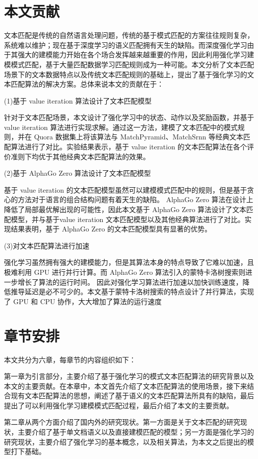 \section{本文贡献}
文本匹配是传统的自然语言处理问题，传统的基于模式匹配的方案往往规则复杂，系统难以维护；现在基于深度学习的语义匹配拥有天生的缺陷。而深度强化学习由于其强大的建模能力开始在各个场合发挥越来越重要的作用，因此利用强化学习建模模式匹配，基于大量匹配数据学习匹配规则成为一种可能。本文分析了文本匹配场景下的文本数据特点以及传统文本匹配规则的基础上，提出了基于强化学习的文本匹配算法的解决方案。总体来说本文的贡献在于：

(1)基于 value iteration 算法设计了文本匹配模型

针对于文本匹配场景，本文设计了强化学习中的状态、动作以及奖励函数，并基于 value iteration 算法进行实现求解。通过这一方法，建模了文本匹配中的模式规则，并在 Quora 数据集上将该算法与 MatchPyramid、MatchSrnn 等经典文本匹配算法进行了对比。实验结果表示，基于 value iteration 的文本匹配算法在各个评价准则下均优于其他经典文本匹配算法的效果。

(2)基于 AlphaGo Zero 算法设计了文本匹配模型

基于 value iteration 的文本匹配模型虽然可以建模模式匹配中的规则，但是基于贪心的方法对于语言的组合结构问题有着天生的缺陷。 AlphaGo Zero 算法在设计上降低了局部最优解出现的可能性，因此本文基于 AlphaGo Zero 算法设计了文本匹配模型，并与基于value iteration 文本匹配模型以及其他经典算法进行了对比。实现结果表明，基于 AlphaGo Zero 的文本匹配模型具有显著的优势。

(3)对文本匹配算法进行加速

强化学习虽然拥有强大的建模能力，但是其算法本身的特点导致了它难以加速，且极难利用 GPU 进行并行计算。而 AlphaGo Zero 算法引入的蒙特卡洛树搜索则进一步增长了算法的运行时间。
因此对强化学习算法进行加速以加快训练速度，降低推导延迟是必不可少的。本文基于蒙特卡洛树搜索的特点设计了并行算法，实现了 GPU 和 CPU 协作，大大增加了算法的运行速度

\section{章节安排}
本文共分为六章，每章节的内容组织如下：

第一章为引言部分，主要介绍了基于强化学习的模式文本匹配算法的研究背景以及本文的主要贡献。在本章中，本文首先介绍了文本匹配算法的使用场景，接下来结合现有文本匹配算法的思想，阐述了基于语义的文本匹配算法所具有的缺陷，最后提出了可以利用强化学习建模模式匹配过程，最后介绍了本文的主要贡献。

第二章从两个方面介绍了国内外的研究现状。第一方面是关于文本匹配的研究现状，主要介绍了基于单文档语义以及直接建模匹配的模型；另一方面是强化学习的研究现状，主要介绍了强化学习的基本概念，以及相关算法，为本文之后提出的模型打下基础。

